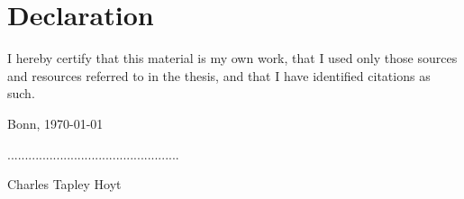 \chapter*{Declaration}
\noindent I hereby certify that this material is my own work, that I used only those sources and resources referred to in the thesis, and that I have identified citations as such.

\vspace{0.3in}

\noindent Bonn, \today

\vspace{1in}
\noindent .................................................

\noindent Charles Tapley Hoyt
